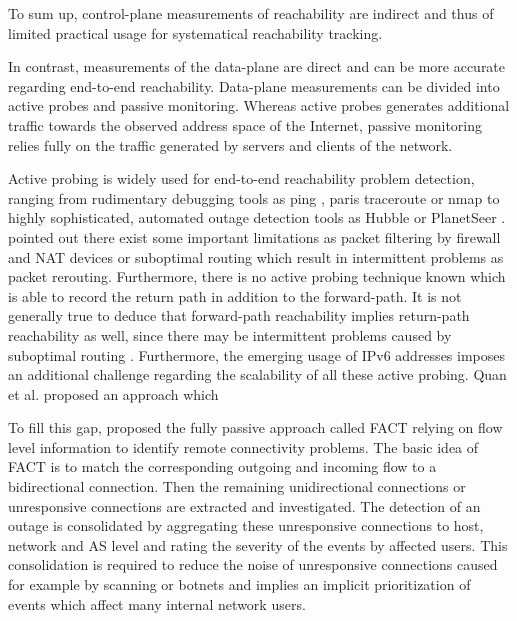 \documentclass{sigcomm-alternate}
\begin{document}
To sum up, control-plane measurements of reachability are indirect
and thus of limited practical usage for systematical reachability
tracking.

In contrast, measurements of the data-plane are direct and can be
more accurate regarding end-to-end reachability. Data-plane
measurements can be divided into active probes and passive monitoring.
Whereas active probes generates additional traffic towards the
observed address space of the Internet, passive monitoring relies
fully on the traffic generated by servers and clients of the network.

Active probing is widely used for end-to-end reachability problem
detection, ranging from rudimentary debugging tools as ping
\cite{PING}, paris traceroute \cite{traceroute} or nmap \cite{Nmap}
to highly sophisticated, automated outage detection tools as Hubble
\cite{Katz:2008} or PlanetSeer \cite{Zhang:2004}. \cite{Bush:Optometry}
pointed out there exist some important limitations as packet filtering
by firewall and NAT devices or suboptimal routing which result in
intermittent problems as packet rerouting. Furthermore, there is
no active probing technique known which is able to record the return
path in addition to the forward-path. It is not generally true to
deduce that forward-path reachability implies return-path reachability
as well, since there may be intermittent problems caused by suboptimal
routing \cite{Bush:Optometry}. Furthermore, the emerging usage of IPv6
addresses imposes an additional challenge regarding the scalability of
all these active probing. Quan et al.\cite{Quan12a} proposed an approach
which

To fill this gap, \cite{SchatzmannPAM2011} proposed the fully
passive approach called FACT relying on flow level information to
identify remote connectivity problems. The basic idea of FACT is to
match the corresponding outgoing and incoming flow to a bidirectional
connection. Then the remaining unidirectional connections or unresponsive
connections are extracted and investigated. The detection of an outage
is consolidated by aggregating these unresponsive connections to host,
network and AS level and rating the severity of the events by affected
users. This consolidation is required to reduce the noise of unresponsive
connections caused for example by scanning or botnets and implies an
implicit prioritization of events which affect many internal network
users.
\end{document}
